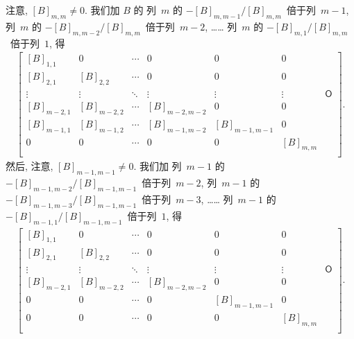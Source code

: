 \documentclass[../libro.tex]{subfiles}
\begin{document}
注意, \([B]_{m,m} \neq 0\).
我们加 \(B\) 的%
列~\(m\) 的 \(-[B]_{m,m-1}/[B]_{m,m}\)~倍于列~\(m-1\),
列~\(m\) 的 \(-[B]_{m,m-2}/[B]_{m,m}\)~倍于列~\(m-2\),
……
列~\(m\) 的 \(-[B]_{m,1}/[B]_{m,m}\)~倍于列~\(1\),
得
\begin{align*}
    \begin{bmatrix}
        [B]_{1,1}   & 0           & \cdots & 0             & 0             & 0         & {}         \\
        [B]_{2,1}   & [B]_{2,2}   & \cdots & 0             & 0             & 0         & {}         \\
        \vdots      & \vdots      & \ddots & \vdots        & \vdots        & \vdots    & \mathsf{O} \\
        [B]_{m-2,1} & [B]_{m-2,2} & \cdots & [B]_{m-2,m-2} & 0             & 0         & {}         \\
        [B]_{m-1,1} & [B]_{m-1,2} & \cdots & [B]_{m-1,m-2} & [B]_{m-1,m-1} & 0         & {}         \\
        0           & 0           & \cdots & 0             & 0             & [B]_{m,m} & {}         \\
    \end{bmatrix}.
\end{align*}
然后, 注意, \([B]_{m-1,m-1} \neq 0\).
我们加%
列~\(m-1\) 的 \(-[B]_{m-1,m-2}/[B]_{m-1,m-1}\)~倍于列~\(m-2\),
列~\(m-1\) 的 \(-[B]_{m-1,m-3}/[B]_{m-1,m-1}\)~倍于列~\(m-3\),
……
列~\(m-1\) 的 \(-[B]_{m-1,1}/[B]_{m-1,m-1}\)~倍于列~\(1\),
得
\begin{align*}
    \begin{bmatrix}
        [B]_{1,1}   & 0           & \cdots & 0             & 0             & 0         & {}         \\
        [B]_{2,1}   & [B]_{2,2}   & \cdots & 0             & 0             & 0         & {}         \\
        \vdots      & \vdots      & \ddots & \vdots        & \vdots        & \vdots    & \mathsf{O} \\
        [B]_{m-2,1} & [B]_{m-2,2} & \cdots & [B]_{m-2,m-2} & 0             & 0         & {}         \\
        0           & 0           & \cdots & 0             & [B]_{m-1,m-1} & 0         & {}         \\
        0           & 0           & \cdots & 0             & 0             & [B]_{m,m} & {}         \\
    \end{bmatrix}.
\end{align*}
\end{document}
